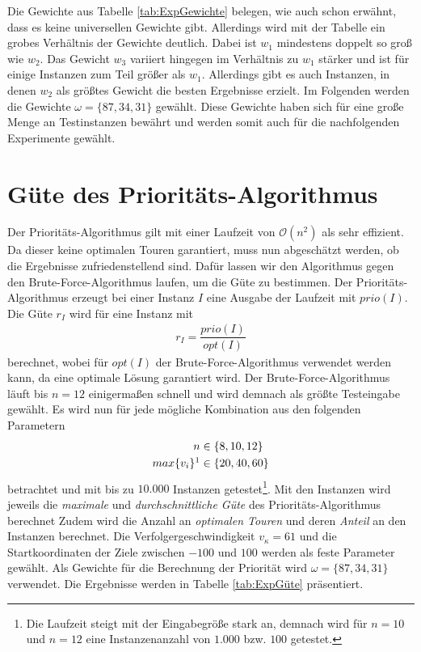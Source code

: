 \documentclass[german,version-2019-11]{uzl-thesis}
\begin{document}
Die Gewichte aus Tabelle \ref{tab:ExpGewichte} belegen, wie auch schon erwähnt, dass es keine universellen Gewichte gibt. Allerdings wird mit der Tabelle ein grobes Verhältnis der Gewichte deutlich. Dabei ist $w_1$ mindestens doppelt so groß wie $w_2$. Das Gewicht $w_3$ variiert hingegen im Verhältnis zu $w_1$ stärker und ist für einige Instanzen zum Teil größer als $w_1$. Allerdings gibt es auch Instanzen, in denen $w_2$ als größtes Gewicht die besten Ergebnisse erzielt. Im Folgenden werden die Gewichte $\omega = \{87,34,31\}$ gewählt. Diese Gewichte haben sich für eine große Menge an Testinstanzen bewährt und werden somit auch für die nachfolgenden Experimente gewählt.

\section{Güte des Prioritäts-Algorithmus}
Der Prioritäts-Algorithmus gilt mit einer Laufzeit von $\mathcal{O}(n^2)$ als sehr effizient. Da dieser keine optimalen Touren garantiert, muss nun abgeschätzt werden, ob die Ergebnisse zufriedenstellend sind. Dafür lassen wir den Algorithmus gegen den Brute-Force-Algorithmus laufen, um die Güte zu bestimmen. Der Prioritäts-Algorithmus erzeugt bei einer Instanz $I$ eine Ausgabe der Laufzeit mit $prio(I)$. Die Güte $r_I$ wird für eine Instanz mit
\begin{align*}
r_I = \dfrac{prio(I)}{opt(I)}
\end{align*} 
berechnet, wobei für $opt(I)$ der Brute-Force-Algorithmus verwendet werden kann, da eine optimale Lösung garantiert wird. Der Brute-Force-Algorithmus läuft bis $n=12$ einigermaßen schnell und wird demnach als größte Testeingabe gewählt. Es wird nun für jede mögliche Kombination aus den folgenden Parametern
\begin{align*}
n&\in\{8,10,12\}\\
max\{v_{i}\}\footnotemark&\in\{20,40,60\} 
\end{align*}
 betrachtet und mit bis zu $10.000$ Instanzen getestet\footnote{Die Laufzeit steigt mit der Eingabegröße stark an, demnach wird für $n=10$ und $n=12$ eine Instanzenanzahl von $1.000$ bzw. $100$ getestet.}. Mit den Instanzen wird jeweils die \emph{maximale} und \emph{durchschnittliche Güte} des Prioritäts-Algorithmus berechnet Zudem wird die Anzahl an \emph{optimalen Touren} und deren \emph{Anteil} an den Instanzen berechnet. Die Verfolgergeschwindigkeit $v_{\kappa}=61$ und die Startkoordinaten der Ziele zwischen $-100$ und $100$ werden als feste Parameter gewählt. Als Gewichte für die Berechnung der Priorität wird $\omega = \{87,34,31\}$ verwendet. Die Ergebnisse werden in Tabelle \ref{tab:ExpGüte} präsentiert.
\end{document}
